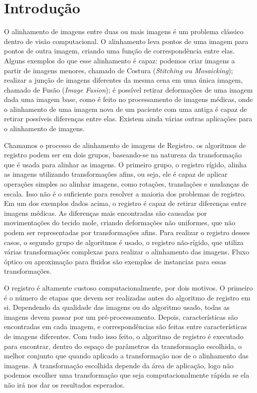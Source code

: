 \chapter{Introdução}
\label{cap:introducao}
	O alinhamento de imagens entre duas ou mais imagens é um problema clássico dentro de visão computacional. O alinhamento
leva pontos de uma imagem para pontos de outra imagem, criando uma função de correspondência entre elas. Alguns exemplos
do que esse alinhamento é capaz: podemos criar imagens a partir de imagens menores, chamado de Costura 
(\textit{Stitching ou Mosaicking}); realizar a junção de imagens diferentes da mesma cena em uma única imagem, chamado 
de Fusão (\textit{Image Fusion}); é possível retirar deformações de uma imagem dada uma imagem base, como é feito no
processamento de imagens médicas, onde o alinhamento de uma imagem nova de um paciente com uma antiga é capaz de
retirar possíveis diferenças entre elas. Existem ainda várias outras aplicações para o alinhamento de imagens.

	Chamamos o processo de alinhamento de imagens de Registro. os algoritmos de registro podem ser em dois grupos, 
baseando-se na natureza da transformação que é usada para alinhar as imagens. O primeiro grupo, o registro rígido, 
alinha as imagens utilizando transformações afins, ou seja, ele é capaz de aplicar operações simples ao alinhar imagens,
como rotações, translações e mudanças de escala. Isso não é o suficiente para resolver a maioria dos problemas de registro.
Em um dos exemplos dados acima, o registro é capaz de retirar diferenças entre imagens médicas. As diferenças mais 
encontradas são causadas por movimentações do tecido mole, criando deformações não uniformes, que não podem ser representadas
por transformações afins. Para realizar o registro desses casos, o segundo grupo de algoritmos é usado, o registro não-rígido, que utiliza várias transformações complexas para realizar o alinhamento das imagens. Fluxo óptico ou aproximação
para fluidos são exemplos de instancias para essas transformações.

	O registro é altamente custoso computacionalmente, por dois motivos. O primeiro é o número de etapas que devem ser
realizadas antes do algoritmo de registro em si. Dependendo da qualidade das imagens ou do algoritmo usado, todas as 
imagens devem passar por um pré-processamento. Depois, características são encontradas em cada imagem, e correspondências
são feitas entre características de imagens diferentes. Com tudo isso feito, o algoritmo de registro é executado para
encontrar, dentro do espaço de parâmetros da transformação escolhida, o melhor conjunto que quando aplicado a transformação
nos de o alinhamento das imagens. A transformação escolhida depende da área de aplicação, logo não podemos escolher uma 
transformação que seja computacionalmente rápida se ela não irá nos dar os resultados esperados.

